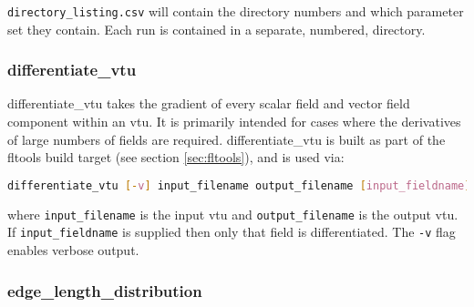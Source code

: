 \lstinline[language = Bash]+directory_listing.csv+ will contain the directory numbers and which parameter set they contain. Each run is contained in a separate, numbered, directory.


\subsubsection{differentiate\_vtu}
\label{sec:differentiate_vtu}

differentiate\_vtu takes the gradient of every scalar field and vector field
component within an vtu. It is primarily intended for cases where the derivatives
of large numbers of fields are required. differentiate\_vtu is built as part of the fltools
build target (see section \ref{sec:fltools}), and is used via:

\begin{lstlisting}[language = Bash]
differentiate_vtu [-v] input_filename output_filename [input_fieldname]
\end{lstlisting}

where \lstinline[language = Bash]+input_filename+ is the input vtu and
\lstinline[language = Bash]+output_filename+ is the output vtu. If
\lstinline[language = Bash]+input_fieldname+ is supplied then only that field
is differentiated. The \lstinline[language = Bash]+-v+ flag enables verbose output.


\subsubsection{edge\_length\_distribution}
\label{sec:edgelengthdist}

